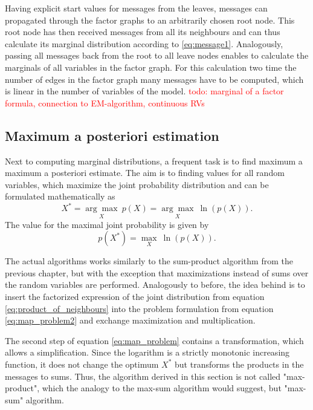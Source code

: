 \documentclass{sigkdd}
\begin{document}
Having explicit start values for messages from the leaves, messages can propagated through the factor graphs to an arbitrarily chosen root node. This root node has then received messages from all its neighbours and can thus calculate its marginal distribution according to \ref{eq:message1}. Analogously, passing all messages back from the root to all leave nodes enables to calculate the marginals of all variables in the factor graph. For this calculation two time the number of edges in the factor graph many messages have to be computed, which is linear in the number of variables of the model.
\textcolor{red}{todo: marginal of a factor formula, connection to EM-algorithm, continuous RVs}


\subsection{Maximum a posteriori estimation}
Next to computing marginal distributions, a frequent task is to find maximum a maximum a posteriori estimate. The aim is to finding values for all random variables, which maximize the joint probability distribution and can be formulated mathematically as
\begin{equation}\label{eq:map_problem}
X^* = \underset{X}{\arg\max}~ p(X) = \underset{X}{\arg\max}~ \ln (p(X)).
\end{equation}
The value for the maximal joint probability is given by
\begin{equation}\label{eq:map_problem2}
p(X^*) = \underset{X}{\max}~ \ln (p(X)).
\end{equation}


The actual algorithms works similarly to the sum-product algorithm from the previous chapter, but with the exception that maximizations instead of sums over the random variables are performed. Analogously to before, the idea behind is to insert the factorized expression of the joint distribution from equation \ref{eq:product_of_neighbours} into the problem formulation from equation \ref{eq:map_problem2} and exchange maximization and multiplication.

The second step of equation \ref{eq:map_problem} contains a transformation, which allows a simplification. Since the logarithm is a strictly monotonic increasing function, it does not change the optimum $X^*$ but transforms the products in the messages to sums. Thus, the algorithm derived in this section is not called "max-product", which the analogy to the max-sum algorithm would suggest, but "max-sum" algorithm.
\end{document}
